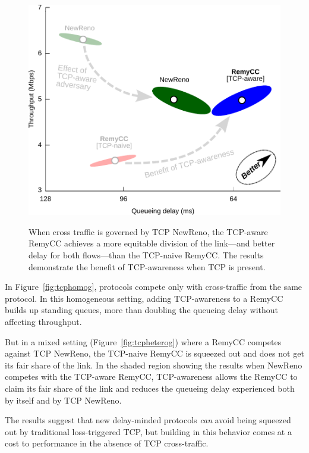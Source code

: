 \begin{figure}
\caption{When cross traffic is governed by TCP NewReno, the TCP-aware
  RemyCC achieves a more equitable division of the link---and better
  delay for both flows---than the TCP-naive RemyCC. The results
  demonstrate the benefit of TCP-awareness when TCP is present.}
\label{fig:tcpheterog}
\begin{center}
\includegraphics[width=\textwidth]{hetero-3.pdf}
\label{fig:tcpawarehetero}
\end{center}
\end{figure}

In Figure~\ref{fig:tcphomog}, protocols compete only with
cross-traffic from the same protocol. In this homogeneous setting,
adding TCP-awareness to a RemyCC builds up standing queues, more than
doubling the queueing delay without affecting throughput.

But in a mixed setting (Figure~\ref{fig:tcpheterog}) where a RemyCC
competes against TCP NewReno, the TCP-naive RemyCC is squeezed out and
does not get its fair share of the link. In the shaded region showing
the results when NewReno competes with the TCP-aware RemyCC,
TCP-awareness allows the RemyCC to claim its fair share of the link
and reduces the queueing delay experienced both by itself and by TCP
NewReno.

The results suggest that new delay-minded protocols \emph{can} avoid
being squeezed out by traditional loss-triggered TCP, but building in
this behavior comes at a cost to performance in the absence of TCP
cross-traffic.

